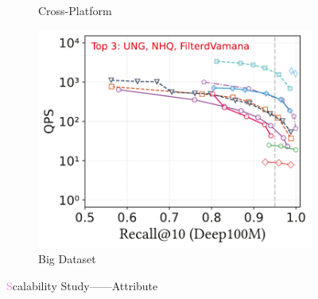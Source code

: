 \documentclass[sigconf, nonacm]{acmart}
\begin{document}
{\begin{figure}[t]
\begin{subfigure}[b]{0.39\textwidth}
		\caption{Cross-Platform}
		\label{fig:attribute-cross-platform}
	\end{subfigure}
	\hfill %
	\begin{subfigure}[b]{0.203\textwidth}
		\centering
		\includegraphics[width=0.96\linewidth]{figures/exp/attribute_100M.pdf} 
		\caption{Big Dataset}
		\label{fig:attribute big dataset}
	\end{subfigure}
	
	\caption{\textcolor{violet}Scalability Study——Attribute}
	\label{fig:TrinityExtension——Attribution_main}
\end{figure}

}
\end{document}
